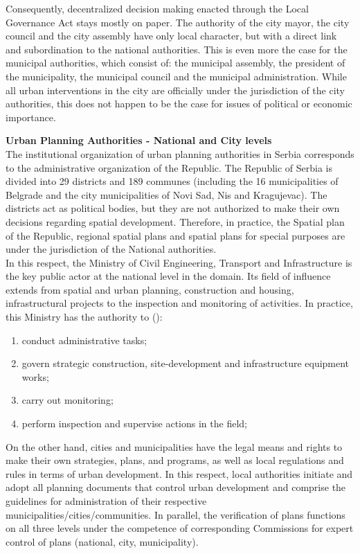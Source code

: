 \documentclass[11pt]{report}
\begin{document}
Consequently, decentralized decision making enacted through the Local Governance Act stays mostly on paper. The authority of the city mayor, the city council and the city assembly have only local character, but with a direct link and subordination to the national authorities. This is even more the case for the municipal authorities, which consist of: the municipal assembly, the president of the municipality, the municipal council and the municipal administration. While all urban interventions in the city are officially under the jurisdiction of the city authorities, this does not happen to be the case for issues of political or economic importance.

\textbf{Urban Planning Authorities - National and City levels}
\\
The institutional organization of urban planning authorities in Serbia corresponds to the administrative organization of the Republic. The Republic of Serbia is divided into 29 districts and 189 communes (including the 16 municipalities of Belgrade and the city municipalities of Novi Sad, Nis and Kragujevac). The districts act as political bodies, but they are not authorized to make their own decisions regarding spatial development. Therefore, in practice, the Spatial plan of the Republic, regional spatial plans and spatial plans for special purposes are under the jurisdiction of the National authorities.
\\
In this respect, the Ministry of Civil Engineering, Transport and Infrastructure is the key public actor at the national level in the domain.
Its field of influence extends from spatial and urban planning, construction and housing, infrastructural projects to the inspection and monitoring of activities.
In practice, this Ministry has the authority to (\href{Maksic}{\citealt{maksic_european_2012}}):

\begin{enumerate}
\item conduct administrative tasks;
\item govern strategic construction, site-development and infrastructure equipment works;
\item carry out monitoring;
\item perform inspection and supervise actions in the field;
\end{enumerate} 

On the other hand, cities and municipalities have the legal means and rights to make their own strategies, plans, and programs, as well as local regulations and rules in terms of urban development. In this respect, local authorities initiate and adopt all planning documents that control urban development and comprise the guidelines for administration of their respective municipalities/cities/communities. In parallel, the verification of plans functions on all three levels under the competence of corresponding Commissions for expert control of plans (national, city, municipality).
\\
\end{document}
